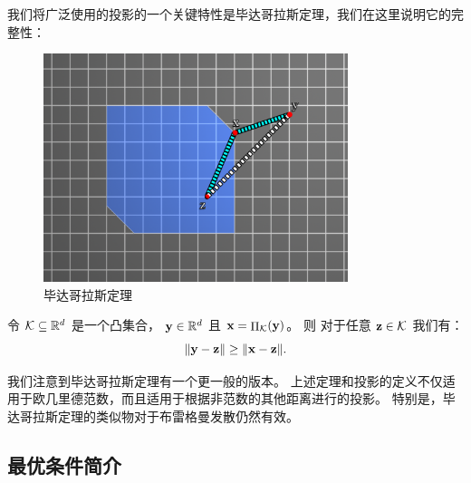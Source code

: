 我们将广泛使用的投影的一个关键特性是毕达哥拉斯定理，我们在这里说明它的完整性：
\begin{figure}[h!]
\begin{center}
\includegraphics[width=3.5in]{figs/fig_pyth}%
\end{center}
\caption{
    毕达哥拉斯定理
    }
\end{figure}
\begin{theorem} \label{thm:pythagoras}
	令  $\mathcal K \subseteq {\mathbb R}^d$ 是一个凸集合， $\mathbf y \in {\mathbb R}^d$ 且 $\mathbf x = \mathop{\Pi}_{\mathcal K}(\mathbf y)$。
    则 对于任意  $\mathbf z \in \mathcal K$ 我们有：
    $$ \| \mathbf y - \mathbf z \| \geq \| \mathbf x - \mathbf z \|.$$
\end{theorem}

我们注意到毕达哥拉斯定理有一个更一般的版本。
上述定理和投影的定义不仅适用于欧几里德范数，而且适用于根据非范数的其他距离进行的投影。
特别是，毕达哥拉斯定理的类似物对于布雷格曼发散仍然有效。

\subsection{
    最优条件简介
    } 

